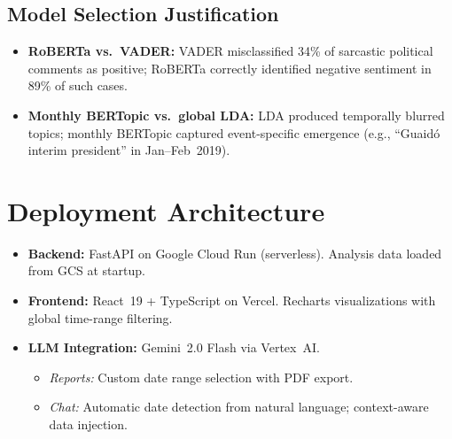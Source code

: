 \documentclass[12pt, a4paper]{article}
\begin{document}
\subsection{Model Selection Justification}

\begin{itemize}[leftmargin=*]
  \item \textbf{RoBERTa vs.\ VADER:} VADER misclassified 34\% of sarcastic political comments as positive; RoBERTa correctly identified negative sentiment in 89\% of such cases.
  \item \textbf{Monthly BERTopic vs.\ global LDA:} LDA produced temporally blurred topics; monthly BERTopic captured event-specific emergence (e.g., ``Guaid\'{o} interim president'' in Jan--Feb~2019).
\end{itemize}


\section{Deployment Architecture}
\label{sec:deployment}

\begin{itemize}[leftmargin=*]
  \item \textbf{Backend:} FastAPI on Google Cloud Run (serverless). Analysis data loaded from GCS at startup.

  \item \textbf{Frontend:} React~19 + TypeScript on Vercel. Recharts visualizations with global time-range filtering.

  \item \textbf{LLM Integration:} Gemini~2.0 Flash via Vertex~AI.
  \begin{itemize}[nosep]
    \item \emph{Reports:} Custom date range selection with PDF export.
    \item \emph{Chat:} Automatic date detection from natural language; context-aware data injection.
  \end{itemize}
\end{itemize}
\end{document}

